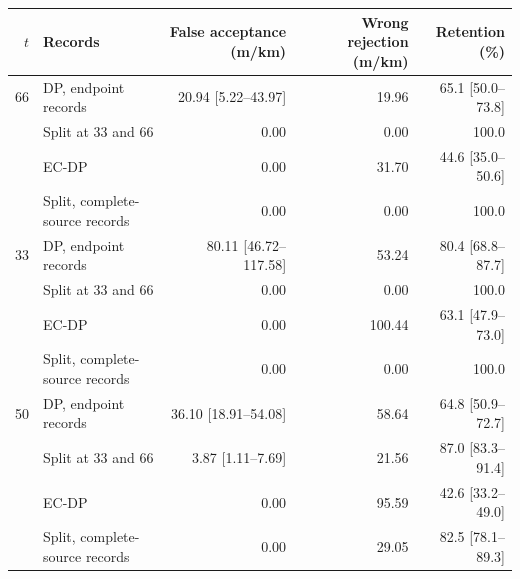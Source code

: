 \documentclass[11pt]{article}
\begin{document}
\noindent\begin{minipage}{\linewidth}
\begin{center}\scriptsize
{}
\begin{tabular}{@{}rlrrr@{}}
\toprule
$t$ & Records & False acceptance (m/km) & Wrong rejection (m/km) & Retention (\%) \\
\midrule
66 & DP, endpoint records & 20.94 [5.22--43.97] & 19.96 & 65.1 [50.0--73.8] \\
 & Split at 33 and 66 & 0.00 & 0.00 & 100.0 \\
 & EC-DP & 0.00 & 31.70 & 44.6 [35.0--50.6] \\
 & Split, complete-source records & 0.00 & 0.00 & 100.0 \\
33 & DP, endpoint records & 80.11 [46.72--117.58] & 53.24 & 80.4 [68.8--87.7] \\
 & Split at 33 and 66 & 0.00 & 0.00 & 100.0 \\
 & EC-DP & 0.00 & 100.44 & 63.1 [47.9--73.0] \\
 & Split, complete-source records & 0.00 & 0.00 & 100.0 \\
50 & DP, endpoint records & 36.10 [18.91--54.08] & 58.64 & 64.8 [50.9--72.7] \\
 & Split at 33 and 66 & 3.87 [1.11--7.69] & 21.56 & 87.0 [83.3--91.4] \\
 & EC-DP & 0.00 & 95.59 & 42.6 [33.2--49.0] \\
 & Split, complete-source records & 0.00 & 29.05 & 82.5 [78.1--89.3] \\
\bottomrule
\end{tabular}
\end{center}
\end{minipage}
\end{document}
